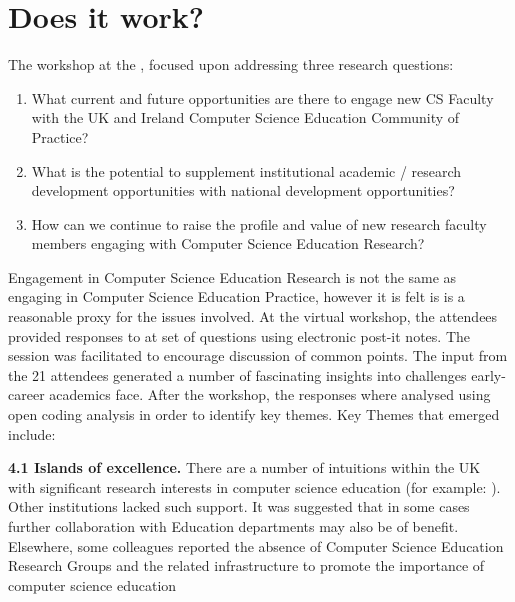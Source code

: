 \documentclass[sigconf]{acmart}
\begin{document}
\section{Does it work?}	

The workshop  at the  , focused upon addressing three research questions:
\begin{enumerate}
\item What current and future opportunities are there to engage new CS Faculty with the UK and Ireland Computer Science Education Community of Practice?
\item What is the potential to supplement institutional academic / research development opportunities with national development opportunities?
\item How can we continue to raise the profile and value of new research faculty members engaging with Computer Science Education Research?
\end{enumerate}
Engagement in Computer Science Education Research is not the same as engaging in Computer Science Education Practice, however it is felt is is a reasonable proxy for the issues involved. At the virtual workshop, the attendees provided responses to at set of questions using electronic post-it notes. The session was facilitated to encourage discussion of common points. The input from the 21 attendees generated a number of fascinating insights into challenges early-career academics face. After the workshop, the responses where analysed using open coding analysis in order to identify key themes. Key Themes that emerged include:

\textbf{4.1 Islands of excellence.}
There are a number of intuitions within the UK with significant research interests in computer science education (for example: ). Other institutions lacked such support. It was suggested that in some cases further collaboration with Education departments may also be of benefit. Elsewhere, some colleagues reported the absence of Computer Science Education Research Groups and the related infrastructure to promote the importance of computer science education
\end{document}
